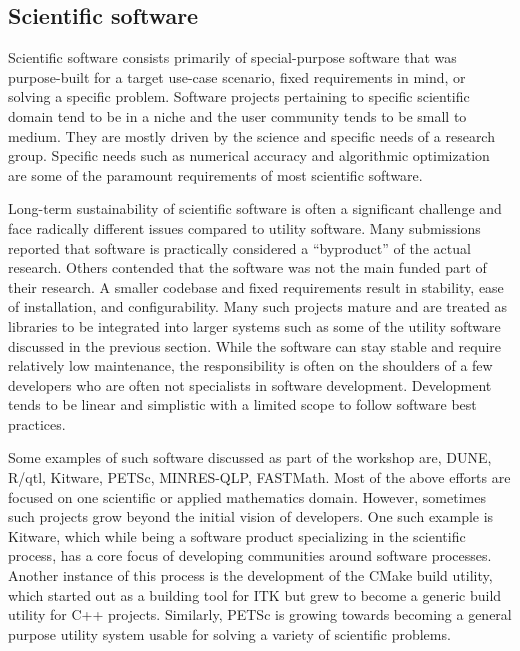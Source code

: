 \documentclass[11pt, oneside]{amsart}
\newcommand{\toolname}[1] {\textsf{#1}}
\begin{document}
\subsection{Scientific software}
Scientific software consists primarily of special-purpose software
that was purpose-built for a target use-case scenario, fixed 
requirements in mind, or solving a specific problem. Software projects
pertaining to specific scientific domain tend to be in a niche and the
user community tends to be small to medium. They are mostly driven by
the science and specific needs of a research group. Specific needs
such as numerical accuracy and algorithmic optimization are some of
the paramount requirements of most scientific software.

Long-term sustainability of scientific software is often a significant
challenge and face radically different issues compared to utility
software.  Many submissions reported that software is practically
considered a ``byproduct'' of the actual research. Others contended
that the software was not the main funded part of their research. A
smaller codebase and fixed requirements result in stability, ease of
installation, and configurability.  Many such projects mature and are
treated as libraries to be integrated into larger systems such as some of
the utility software discussed in the previous section. While the
software can stay stable and require relatively low maintenance, the
responsibility is often on the shoulders of a few developers who
are often not specialists in software development. Development tends to
be linear and simplistic with a limited scope to follow software best
practices.

Some examples of such software discussed as part of the workshop are,
\toolname{DUNE}, \toolname{R/qtl}, \toolname{Kitware},
\toolname{PETSc}, \toolname{MINRES-QLP}, \toolname{FASTMath}.  Most of
the above efforts are focused on one scientific or applied
mathematics domain. However, sometimes such projects grow beyond the
initial vision of developers. One such example is \toolname{Kitware},
which while being a software product specializing in the scientific
process, has a core focus of developing communities around software
processes. Another instance of this process is the development of the
\toolname{CMake} build utility, which started out as a building tool
for \toolname{ITK} but grew to become a generic build utility for C++
projects. Similarly, \toolname{PETSc} is growing towards becoming a
general purpose utility system usable for solving a variety of
scientific problems.
\end{document}
